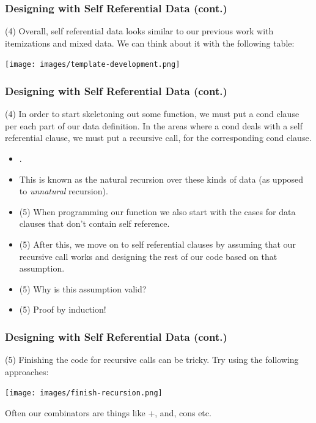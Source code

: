 \documentclass{beamer}
\begin{document}

\begin{frame}
  \frametitle{Designing with Self Referential Data (cont.)}
  (4) Overall, self referential data looks similar to our previous work with itemizations and mixed data. We can think about it with the
  following table:
  \begin{center}
    \texttt{[image: images/template-development.png]}
  \end{center}
\end{frame}



\begin{frame}
  \frametitle{Designing with Self Referential Data (cont.)}
   (4) In order to start skeletoning out some function, we must put a cond clause per each part of our data definition. In the areas where a cond
   deals with a self referential clause, we must put a recursive call, for the corresponding cond clause.
   \begin{itemize}
   \item<2-> \naturalRecursion.
   \item<3-> This is known as the natural recursion over these kinds of data (as upposed to \emph{unnatural} recursion).
   \item<4-> (5) When programming our function we also start with the cases for data clauses that don't contain self reference.
   \item<5-> (5) After this, we move on to self referential clauses by assuming that our recursive call works and designing the rest of our
     code based on that assumption.
   \item<6-> (5) Why is this assumption valid?
   \item<7-> (5) Proof by induction!
   \end{itemize}
 \end{frame}

 \begin{frame}
   \frametitle{Designing with Self Referential Data (cont.)}
   (5) Finishing the code for recursive calls can be tricky. Try using the following approaches:
   \begin{center}
     \texttt{[image: images/finish-recursion.png]}

   \end{center}
   Often our combinators are things like +, and, cons etc.
 \end{frame}
 
\end{document}

